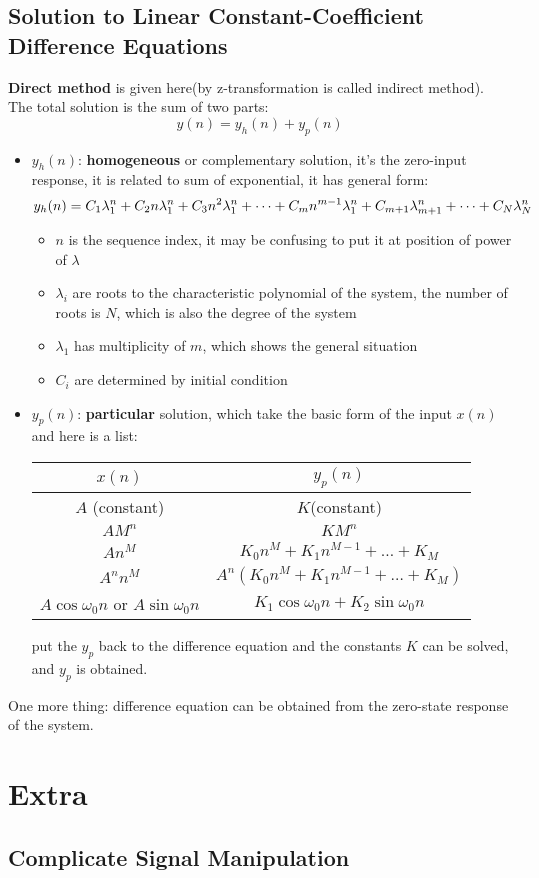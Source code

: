 \documentclass[10pt,a4paper,oneside]{article}
\begin{document}
\subsection{Solution to Linear Constant-Coefficient Difference Equations}
\textbf{Direct method} is given here(by z-transformation is called indirect method). The total solution is the sum of two parts:
\[
y(n) = y_h(n) + y_p(n)
\] 
\begin{itemize}
	\item $y_h(n)$: \textbf{homogeneous} or complementary solution, it's the zero-input response, it is related to sum of exponential, it has general form:
	\[
	y_h(n) = C_1 \lambda_1^n + C_2 n \lambda_1^n + C_3 n^2 \lambda_1^n + \cdots + C_m n^{m-1} \lambda_1^n\\
	+C_{m+1}\lambda_{m+1}^n + \cdots + C_N \lambda_N ^n
	\]
	\begin{itemize}
		\item $n$ is the sequence index, it may be confusing to put it at position of power of $\lambda$
		\item $\lambda_i$ are roots to the characteristic polynomial of the system, the number of roots is $N$, which is also the degree of the system
		\item $\lambda_1$ has multiplicity of $m$, which shows the general situation
		\item $C_i$ are determined by initial condition
	\end{itemize}
	\item $y_p(n)$: \textbf{particular} solution, which take the basic form of the input $x(n)$ and here is a list:
	
	\begin{tabular}{|c|c|}
		\hline 
		$x(n)$ & $y_p(n)$ \\ 
		\hline 
		$A$ (constant) & $K$(constant) \\ 
		$AM^n$ & $KM^n$ \\ 
		$An^M$ & $K_0 n^M + K_1 n^{M-1} + \dots+ K_M$ \\ 
		$A^n n^M$ & $A^n(K_0 n^M + K_1 n^{M-1} + \dots+ K_M)$ \\ 
		$A \cos \omega_0 n$ or $A \sin \omega_0 n$ & $K_1 \cos \omega_0 n + K_2 \sin \omega_0 n$ \\ 
		\hline 
	\end{tabular}

	put the $y_p$ back to the difference equation and the constants $K$ can be solved, and $y_p$ is obtained.
\end{itemize}
One more thing: difference equation can be obtained from the zero-state response of the system.
















\section{Extra}
\subsection{Complicate Signal Manipulation}
\end{document}
